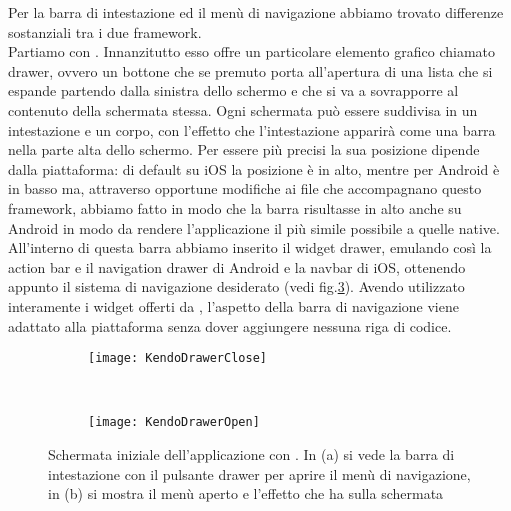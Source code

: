 			Per la barra di intestazione ed il menù di navigazione abbiamo trovato 
			differenze sostanziali tra i due framework.\\
			Partiamo con \kendomob{}.
			Innanzitutto esso offre un particolare elemento grafico chiamato drawer, 
			ovvero un bottone che se premuto porta all'apertura di 
			una lista che si espande partendo dalla sinistra dello schermo e che 
			si va a sovrapporre al contenuto della schermata stessa.
			Ogni schermata può essere suddivisa in un intestazione e un corpo, 
			con l'effetto che l'intestazione apparirà come una barra nella parte alta 
			dello schermo. Per essere più precisi la sua posizione dipende dalla
			piattaforma: di default su iOS la posizione è in alto, mentre per Android 
			è in basso ma, attraverso opportune modifiche ai file \css{} che accompagnano 
			questo framework, abbiamo fatto in modo che la barra risultasse in alto 
			anche su Android in modo da rendere l'applicazione il più simile possibile 
			a quelle native.
			All'interno di questa barra abbiamo inserito il widget drawer, emulando 
			così la action bar e il navigation drawer di Android e la navbar di iOS,
			ottenendo appunto il sistema di navigazione desiderato (vedi fig.\ref{fig:kendodrawer}).
			Avendo utilizzato interamente i widget offerti da \kendomob{}, l'aspetto 
			della barra di navigazione viene adattato alla piattaforma senza 
			dover aggiungere nessuna riga di codice.
			\begin{figure}[h]
				\centering
				\begin{subfigure}[b]{0.485\textwidth}
					\texttt{[image: KendoDrawerClose]}
					\caption{}
					\label{fig:kendoDrawerClose}
				\end{subfigure}
				~
				\begin{subfigure}[b]{0.485\textwidth}
					\texttt{[image: KendoDrawerOpen]}
					\caption{}
					\label{fig:kendoDrawerOpen}
				\end{subfigure}
				\caption{Schermata iniziale dell'applicazione con \kendomob{}. 
				In (a) si vede la barra di intestazione con il pulsante drawer 
				per aprire il menù di navigazione, in (b) si mostra il menù aperto 
				e l'effetto che ha sulla schermata}
				\label{fig:kendodrawer}
			\end{figure}
		
